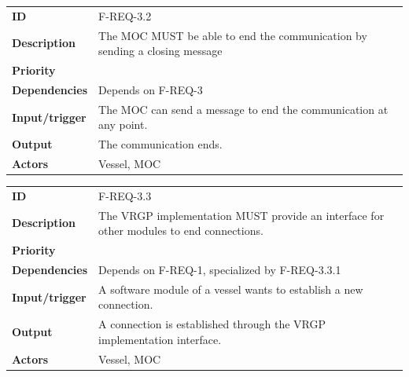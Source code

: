 \begin{table}[H]
	\centering
	\begin{tabularx}{\textwidth}{ l X }
		\rowcolor[HTML]{E7E7E7}
		\textbf{ID} & F-REQ-3.2 \\
		\textbf{Description} & The MOC MUST be able to end the communication by sending a closing message \\
		\rowcolor[HTML]{E7E7E7}
		\textbf{Priority} & \priohigh \\
		\textbf{Dependencies} & Depends on F-REQ-3 \\
		\rowcolor[HTML]{E7E7E7}
		\textbf{Input/trigger} & The MOC can send a message to end the communication at any point. \\
		\textbf{Output} & The communication ends. \\
		\rowcolor[HTML]{E7E7E7}
		\textbf{Actors} & Vessel, MOC \\
	\end{tabularx}
	\label{table:f-req-3.2}
\end{table}

\begin{table}[H]		
	\centering
	\begin{tabularx}{\textwidth}{ l X }
		\rowcolor[HTML]{E7E7E7}
		\textbf{ID} & F-REQ-3.3 \\
		\textbf{Description} & The VRGP implementation MUST provide an interface for other modules to end connections. \\
		\rowcolor[HTML]{E7E7E7}
		\textbf{Priority} & \priohigh \\
		\textbf{Dependencies} & Depends on F-REQ-1, specialized by F-REQ-3.3.1 \\
		\rowcolor[HTML]{E7E7E7}
		\textbf{Input/trigger} & A software module of a vessel wants to establish a new connection. \\
		\textbf{Output} & A connection is established through the VRGP implementation interface. \\
		\rowcolor[HTML]{E7E7E7}
		\textbf{Actors} & Vessel, MOC \\
	\end{tabularx}
	\label{table:f-req-3.3}
\end{table}

